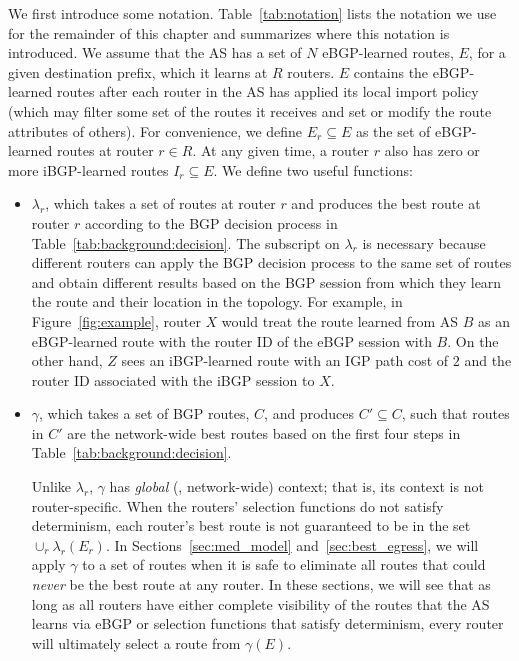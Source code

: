 We first introduce some notation.  Table~\ref{tab:notation} lists
the notation we use for the remainder of this chapter and summarizes
where this notation is introduced.  We assume that the AS has a set of
$N$ eBGP-learned routes, $E$, for a given destination prefix, which it
learns at $R$ routers.  $E$ contains the eBGP-learned routes after each
router in the AS has applied its local import policy (which may filter
some set of the routes it receives and set or modify the route
attributes of others).  For convenience, we define $E_r \subseteq E$ as
the set of eBGP-learned routes at router $r\in R$.  At any given time, a
router $r$ also has zero or more iBGP-learned routes $I_r \subseteq E$.
We define two useful functions:
\begin{itemize}
\itemsep=-1pt
\item $\lambda_r$, which takes a set of routes at router $r$ and
  produces the best route at router $r$ according to the BGP decision
  process in Table~\ref{tab:background:decision}.  The subscript on
  $\lambda_r$ is necessary because different routers can apply the BGP
  decision process to the same set of routes and obtain different
  results based on the BGP session from which they learn the route and
  their location in the topology.  For example, in
  Figure~\ref{fig:example}, router $X$ would treat the route learned
  from AS $B$ as an eBGP-learned route with the router ID of the eBGP
  session with $B$. On the other hand, $Z$ sees an iBGP-learned route
  with an IGP path cost of $2$ and the router ID associated with the
  iBGP session to $X$.

\item $\gamma$, which takes a set of BGP routes, $C$, and produces $C'
  \subseteq C$, such that routes in $C'$ are the network-wide best
  routes based on the first four steps in
  Table~\ref{tab:background:decision}.

  Unlike $\lambda_r$, $\gamma$ has {\em global} (\ie, network-wide)
  context; that is, its context is not router-specific.  When the
  routers' selection functions do not satisfy determinism, each router's
  best route is not guaranteed to be in the set $\cup_r \lambda_r(E_r)$.
  In Sections~\ref{sec:med_model} and~\ref{sec:best_egress}, we will
  apply $\gamma$ to a set of routes when it is safe to eliminate all
  routes that could {\em never} be the best route at any router.  In
  these sections, we will see that as long as all routers have either
  complete visibility of the routes that the AS learns via eBGP or
  selection functions that satisfy determinism, every router will
  ultimately select a route from $\gamma(E)$.
\end{itemize}


